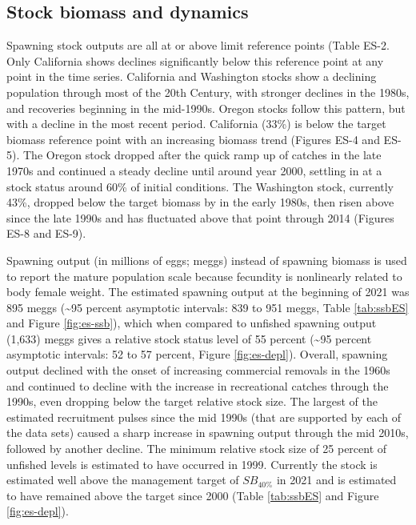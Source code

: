 \documentclass[11pt,
  english,
  letterpaper,
]{article}
\begin{document}
\hypertarget{stock-biomass-and-dynamics}{%
\subsection*{Stock biomass and dynamics}\label{stock-biomass-and-dynamics}}

Spawning stock outputs are all at or above limit reference points (Table ES-2. Only California shows declines significantly below this reference point at any point in the time series. California and Washington stocks show a declining population through most of the 20th Century, with stronger declines in the 1980s, and recoveries beginning in the mid-1990s. Oregon stocks follow this pattern, but with a decline in the most recent period. California (33\%) is below the target biomass reference point with an increasing biomass trend (Figures ES-4 and ES-5). The Oregon stock dropped after the quick ramp up of catches in the late 1970s and continued a steady decline until around year 2000, settling in at a stock status around 60\% of initial conditions. The Washington stock, currently 43\%, dropped below the target biomass by in the early 1980s, then risen above since the late 1990s and has fluctuated above that point through 2014 (Figures ES-8 and ES-9).

Spawning output (in millions of eggs; meggs) instead of spawning biomass is used to report the mature population scale because fecundity is nonlinearly related to body female weight. The estimated spawning output at the beginning of 2021 was 895 meggs (\textasciitilde95 percent asymptotic intervals: 839 to 951 meggs, Table \ref{tab:ssbES} and Figure \ref{fig:es-ssb}), which when compared to unfished spawning output (1,633) meggs gives a relative stock status level of 55 percent (\textasciitilde95 percent asymptotic intervals: 52 to 57 percent, Figure \ref{fig:es-depl}). Overall, spawning output declined with the onset of increasing commercial removals in the 1960s and continued to decline with the increase in recreational catches through the 1990s, even dropping below the target relative stock size. The largest of the estimated recruitment pulses since the mid 1990s (that are supported by each of the data sets) caused a sharp increase in spawning output through the mid 2010s, followed by another decline. The minimum relative stock size of 25 percent of unfished levels is estimated to have occurred in 1999. Currently the stock is estimated well above the management target of \(SB_{40\%}\) in 2021 and is estimated to have remained above the target since 2000 (Table \ref{tab:ssbES} and Figure \ref{fig:es-depl}).
\end{document}
